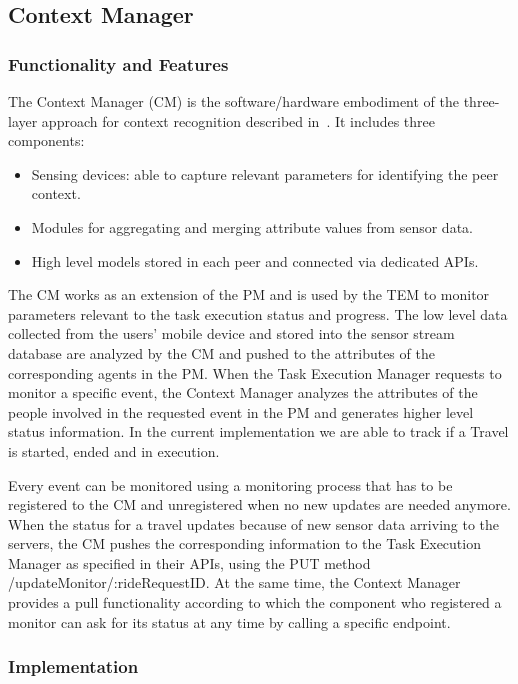 \subsection{Context Manager}
\subsubsection{Functionality and Features}

The Context Manager (CM) is the software/hardware embodiment of the three-layer approach for context recognition described in~\cite{D4.3}. It includes three components:
\begin{itemize}
\item Sensing devices: able to capture relevant parameters for identifying the peer context.
\item Modules for aggregating and merging attribute values from sensor data.
\item High level models stored in each peer and connected via dedicated APIs.
\end{itemize}
The CM works as an extension of the PM and is used by the TEM to monitor parameters relevant to the task execution status and progress. The low level data collected from the users' mobile device and stored into the sensor stream database are analyzed by the CM and pushed to the attributes of the corresponding agents in the PM. When the Task Execution Manager requests to monitor a specific event, the Context Manager analyzes the attributes of the people involved in the requested event in the PM and generates higher level status information. In the current implementation we are able to track if a Travel is started, ended and in execution.

Every event can be monitored using a monitoring process that has to be registered to the CM and unregistered when no new updates are needed anymore. When the status for a travel updates because of new sensor data arriving to the servers, the CM pushes the corresponding information to the Task Execution Manager as specified in their APIs, using the PUT method /updateMonitor/:rideRequestID. At the same time, the Context Manager provides a pull functionality according to which the component who registered a monitor can ask for its status at any time by calling a specific endpoint.

\subsubsection{Implementation}

